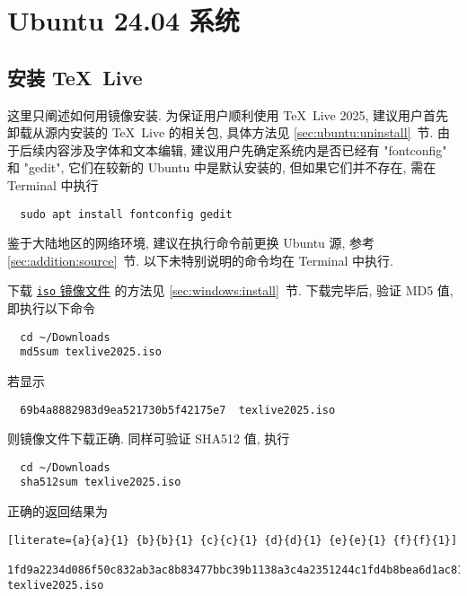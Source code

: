 
\chapter{Ubuntu 24.04 系统}

\section{安装 \TeX~Live}\label{chap:ubuntu:sec:install}

这里只阐述如何用镜像安装.
为保证用户顺利使用 \TeX~Live 2025,
建议用户首先卸载从源内安装的 \TeX~Live 的相关包,
具体方法见 \ref{sec:ubuntu:uninstall}~节.
由于后续内容涉及字体和文本编辑,
建议用户先确定系统内是否已经有 "fontconfig" 和 "gedit",
它们在较新的 Ubuntu 中是默认安装的,
但如果它们并不存在,
需在 \textsf{Terminal} 中执行
\begin{lstlisting}
  sudo apt install fontconfig gedit
\end{lstlisting}
鉴于大陆地区的网络环境,
建议在执行命令前更换 Ubuntu 源,
参考 \ref{sec:addition:source}~节.
以下未特别说明的命令均在 \textsf{Terminal} 中执行.

下载
\href{https://mirrors.ctan.org/systems/texlive/Images/texlive2025.iso}{\texttt{iso} 镜像文件}
的方法见 \ref{sec:windows:install}~节.
下载完毕后,
验证 MD5 值,
即执行以下命令
\begin{lstlisting}
  cd ~/Downloads
  md5sum texlive2025.iso
\end{lstlisting}
若显示
\begin{lstlisting}
  69b4a8882983d9ea521730b5f42175e7  texlive2025.iso
\end{lstlisting}
则镜像文件下载正确.
同样可验证 SHA512 值,
执行
\begin{lstlisting}
  cd ~/Downloads
  sha512sum texlive2025.iso
\end{lstlisting}
正确的返回结果为
\begin{lstlisting}[literate={a}{a}{1} {b}{b}{1} {c}{c}{1} {d}{d}{1} {e}{e}{1} {f}{f}{1}]
  1fd9a2234d086f50c832ab3ac8b83477bbc39b1138a3c4a2351244c1fd4b8bea6d1ac81d4a5b0cba95f2e82c00f0d9df5b33189eb222e4bae5dae1523ef0da0e  texlive2025.iso
\end{lstlisting}

